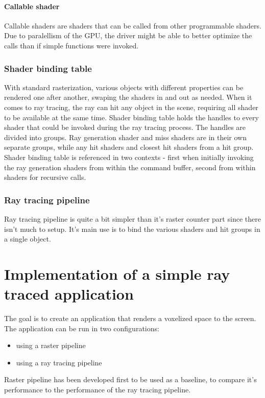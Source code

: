 \documentclass[times, utf8, zavrsni, numeric]{fer}
\begin{document}
\subsubsection{Callable shader}
Callable shaders are shaders that can be called from other programmable shaders. Due to paralellism of the GPU, the driver might be able to better optimize the calls than if simple functions were invoked.

\subsection{Shader binding table}
With standard rasterization, various objects with different properties can be rendered one after another, swaping the shaders in and out as needed. When it comes to ray tracing, the ray can hit any object in the scene, requiring all shader to be available at the same time. Shader binding table holds the handles to every shader that could be invoked during the ray tracing process. The handles are divided into groups. Ray generation shader and miss shaders are in their own separate groups, while any hit shaders and closest hit shaders from a hit group. Shader binding table is referenced in two contexts - first when initially invoking the ray generation shaders from within the command buffer, second from within shaders for recursive calls.

\subsection{Ray tracing pipeline}
Ray tracing pipeline is quite a bit simpler than it's raster counter part since there isn't much to setup. It's main use is to bind the various shaders and hit groups in a single object. 


\chapter{Implementation of a simple ray traced application}
The goal is to create an application that renders a voxelized space to the screen. The application can be run in two configurations:
\begin{itemize}
	\item using a raster pipeline
	\item using a ray tracing pipeline
\end{itemize}

Raster pipeline has been developed first to be used as a baseline, to compare it's performance to the performance of the ray tracing pipeline.
\end{document}
